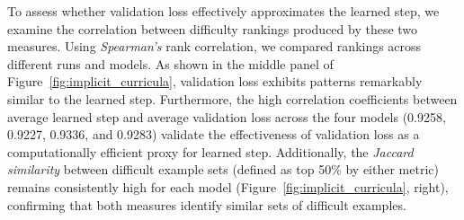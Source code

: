 To assess whether validation loss effectively approximates the learned step, we examine the correlation between difficulty rankings produced by these two measures. Using \textit{Spearman’s} rank correlation, we compared rankings across different runs and models. As shown in the middle panel of Figure~\ref{fig:implicit_curricula}, validation loss exhibits patterns remarkably similar to the learned step. Furthermore, the high correlation coefficients between average learned step and average validation loss across the four models (0.9258, 0.9227, 0.9336, and 0.9283) validate the effectiveness of validation loss as a computationally efficient proxy for learned step. 
Additionally, the \textit{Jaccard similarity} between difficult example sets (defined as top 50\% by either metric) remains consistently high for each model (Figure~\ref{fig:implicit_curricula}, right), confirming that both measures identify similar sets of difficult examples. 


